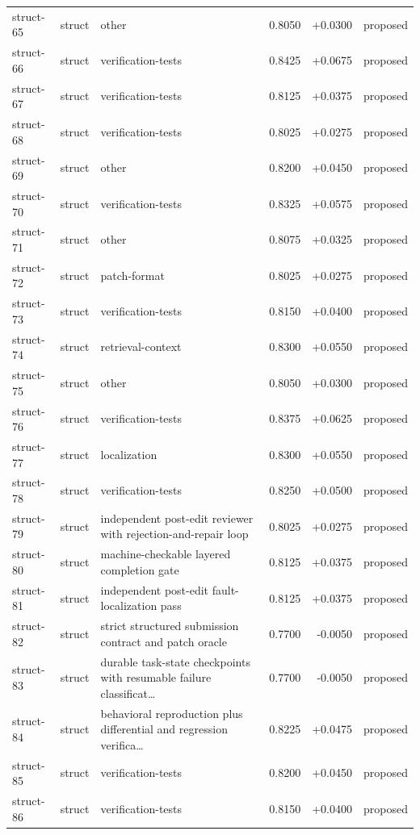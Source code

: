 \begin{center}
\begin{longtable}{llp{5.2cm}rrl}
struct-65 & struct & other & 0.8050 & +0.0300 & proposed \\
struct-66 & struct & verification-tests & 0.8425 & +0.0675 & proposed \\
struct-67 & struct & verification-tests & 0.8125 & +0.0375 & proposed \\
struct-68 & struct & verification-tests & 0.8025 & +0.0275 & proposed \\
struct-69 & struct & other & 0.8200 & +0.0450 & proposed \\
struct-70 & struct & verification-tests & 0.8325 & +0.0575 & proposed \\
struct-71 & struct & other & 0.8075 & +0.0325 & proposed \\
struct-72 & struct & patch-format & 0.8025 & +0.0275 & proposed \\
struct-73 & struct & verification-tests & 0.8150 & +0.0400 & proposed \\
struct-74 & struct & retrieval-context & 0.8300 & +0.0550 & proposed \\
struct-75 & struct & other & 0.8050 & +0.0300 & proposed \\
struct-76 & struct & verification-tests & 0.8375 & +0.0625 & proposed \\
struct-77 & struct & localization & 0.8300 & +0.0550 & proposed \\
struct-78 & struct & verification-tests & 0.8250 & +0.0500 & proposed \\
struct-79 & struct & independent post-edit reviewer with rejection-and-repair loop & 0.8025 & +0.0275 & proposed \\
struct-80 & struct & machine-checkable layered completion gate & 0.8125 & +0.0375 & proposed \\
struct-81 & struct & independent post-edit fault-localization pass & 0.8125 & +0.0375 & proposed \\
struct-82 & struct & strict structured submission contract and patch oracle & 0.7700 & -0.0050 & proposed \\
struct-83 & struct & durable task-state checkpoints with resumable failure classificat\ldots{} & 0.7700 & -0.0050 & proposed \\
struct-84 & struct & behavioral reproduction plus differential and regression verifica\ldots{} & 0.8225 & +0.0475 & proposed \\
struct-85 & struct & verification-tests & 0.8200 & +0.0450 & proposed \\
struct-86 & struct & verification-tests & 0.8150 & +0.0400 & proposed \\

\end{longtable}
\end{center}
